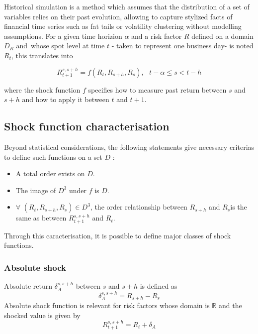 \documentclass[10pt,a4paper]{report}
\begin{document}
Historical simulation is a method which assumes that the distribution of a
set of variables relies on their past evolution, allowing to capture stylized
facts of financial time series such as fat tails or volatility clustering
without modelling assumptions. For a given time horizion $\alpha $ and a
risk factor $R$ defined on a domain $D_{R}$ and\ whose spot level at time $t$
- taken to represent one business day- is noted $R_{t}$, this translates
into

\begin{equation*}
R_{t+1}^{s,s+h}=f(R_{t},R_{s+h},R_{s}),\text{ \ \ }t-\alpha \leq s<t-h
\end{equation*}

where the shock function $f$ specifies how to measure past return between $s$
and $s+h$ and how to apply it between $t$ and $t+1$.


\subsection{Shock function characterisation}
Beyond statistical
considerations, the following statements give necessary criterias to
define such functions on a set $D$ :

\bigskip

\begin{itemize}
\item A total order exists on $D.$
\item The image of $D^{3}$ under $f$ is $D.$
\item $\forall $ $(R_{t},R_{s+h},R_{s})\in D^{3}$, the order relationship
between $R_{s+h}$ and $R_{s}$is the same as between $R_{t+1}^{s,s+h}$ and $%
R_{t}.$
\end{itemize}

\bigskip 

Through this caracterisation, it is possible to define major classes of shock functions.

\subsubsection{Absolute shock}

Absolute return $\delta _{A}^{s,s+h}$ between $s$ and $s+h$ is defined as%
\begin{equation*}
\delta _{A}^{s,s+h}=R_{s+h}-R_{s}
\end{equation*}%
Absolute shock function is relevant for risk factors whose domain is $%
\mathbb{R}$ and the shocked value is given by 
\begin{equation*}
R_{t+1}^{s,s+h}=R_{t}+\delta _{A}
\end{equation*}
\end{document}
